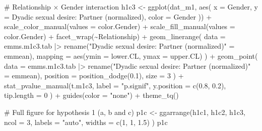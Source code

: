 \documentclass[
  bookmarksnumbered]{article}
\newenvironment{Shaded}{\begin{snugshade}}{\end{snugshade}}
\newcommand{\AttributeTok}[1]{\textcolor[rgb]{0.80,0.80,0.80}{#1}}
\newcommand{\CommentTok}[1]{\textcolor[rgb]{0.50,0.62,0.50}{#1}}
\newcommand{\DecValTok}[1]{\textcolor[rgb]{0.86,0.86,0.80}{#1}}
\newcommand{\FloatTok}[1]{\textcolor[rgb]{0.75,0.75,0.82}{#1}}
\newcommand{\FunctionTok}[1]{\textcolor[rgb]{0.94,0.94,0.56}{#1}}
\newcommand{\NormalTok}[1]{\textcolor[rgb]{0.80,0.80,0.80}{#1}}
\newcommand{\OtherTok}[1]{\textcolor[rgb]{0.94,0.94,0.56}{#1}}
\newcommand{\SpecialCharTok}[1]{\textcolor[rgb]{0.86,0.64,0.64}{#1}}
\newcommand{\StringTok}[1]{\textcolor[rgb]{0.80,0.58,0.58}{#1}}
\begin{document}
\begin{Shaded}
\begin{Highlighting}[]
\CommentTok{\# Relationship × Gender interaction}
\NormalTok{h1c3 }\OtherTok{\textless{}{-}} \FunctionTok{ggplot}\NormalTok{(dat\_m1, }\FunctionTok{aes}\NormalTok{(}
  \AttributeTok{x =}\NormalTok{ Gender, }\AttributeTok{y =} \StringTok{\textasciigrave{}}\AttributeTok{Dyadic sexual desire: Partner (normalized)}\StringTok{\textasciigrave{}}\NormalTok{,}
  \AttributeTok{color =}\NormalTok{ Gender}
\NormalTok{)) }\SpecialCharTok{+}
  \FunctionTok{scale\_color\_manual}\NormalTok{(}\AttributeTok{values =}\NormalTok{ color.Gender) }\SpecialCharTok{+}
  \FunctionTok{scale\_fill\_manual}\NormalTok{(}\AttributeTok{values =}\NormalTok{ color.Gender) }\SpecialCharTok{+}
  \FunctionTok{facet\_wrap}\NormalTok{(}\SpecialCharTok{\textasciitilde{}}\NormalTok{Relationship) }\SpecialCharTok{+}
  \FunctionTok{geom\_linerange}\NormalTok{(}
    \AttributeTok{data =}\NormalTok{ emms.m1c3.tab }\SpecialCharTok{|\textgreater{}}
      \FunctionTok{rename}\NormalTok{(}\StringTok{"Dyadic sexual desire: Partner (normalized)"} \OtherTok{=}\NormalTok{ emmean),}
    \AttributeTok{mapping =} \FunctionTok{aes}\NormalTok{(}\AttributeTok{ymin =}\NormalTok{ lower.CL, }\AttributeTok{ymax =}\NormalTok{ upper.CL)}
\NormalTok{  ) }\SpecialCharTok{+}
  \FunctionTok{geom\_point}\NormalTok{(}
    \AttributeTok{data =}\NormalTok{ emms.m1c3.tab }\SpecialCharTok{|\textgreater{}}
      \FunctionTok{rename}\NormalTok{(}\StringTok{"Dyadic sexual desire: Partner (normalized)"} \OtherTok{=}\NormalTok{ emmean),}
    \AttributeTok{position =} \FunctionTok{position\_dodge}\NormalTok{(}\FloatTok{0.1}\NormalTok{),}
    \AttributeTok{size =} \DecValTok{3}
\NormalTok{  ) }\SpecialCharTok{+}
  \FunctionTok{stat\_pvalue\_manual}\NormalTok{(t.m1c3,}
    \AttributeTok{label =} \StringTok{"p.signif"}\NormalTok{,}
    \AttributeTok{y.position =} \FunctionTok{c}\NormalTok{(}\FloatTok{0.8}\NormalTok{, }\FloatTok{0.2}\NormalTok{),}
    \AttributeTok{tip.length =} \DecValTok{0}
\NormalTok{  ) }\SpecialCharTok{+}
  \FunctionTok{guides}\NormalTok{(}\AttributeTok{color =} \StringTok{"none"}\NormalTok{) }\SpecialCharTok{+}
  \FunctionTok{theme\_tq}\NormalTok{()}

\CommentTok{\# Full figure for hypothesis 1 (a, b and c)}
\NormalTok{p1c }\OtherTok{\textless{}{-}} \FunctionTok{ggarrange}\NormalTok{(h1c1, h1c2, h1c3,}
  \AttributeTok{ncol =} \DecValTok{3}\NormalTok{,}
  \AttributeTok{labels =} \StringTok{"auto"}\NormalTok{,}
  \AttributeTok{widths =} \FunctionTok{c}\NormalTok{(}\DecValTok{1}\NormalTok{, }\DecValTok{1}\NormalTok{, }\FloatTok{1.5}\NormalTok{)}
\NormalTok{)}
\NormalTok{p1c}
\end{Highlighting}
\end{Shaded}
\end{document}
